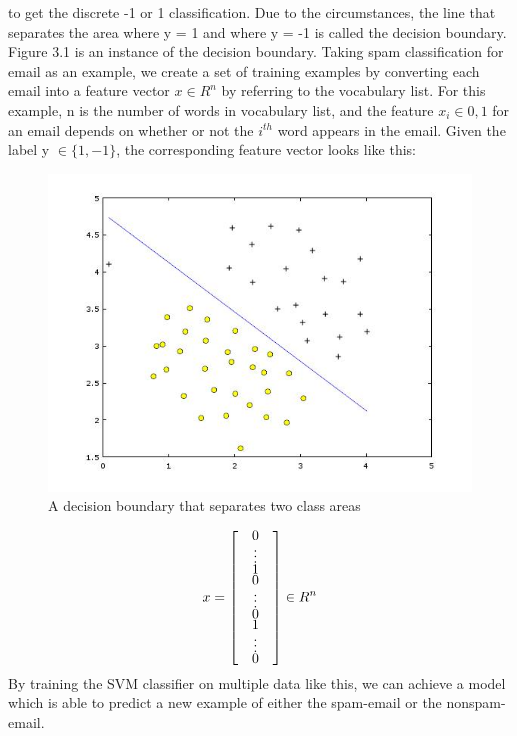 to get the discrete -1 or 1 classification. Due to the circumstances, the line that separates the area where y = 1 and where y = -1 is called the decision boundary. Figure 3.1 is an instance of the decision boundary. Taking spam classification for email as an example, we create a set of training examples by converting each email into a feature vector $x \in R^n$ by referring to the vocabulary list. For this example, n is the number of words in vocabulary list, and the feature $x_i\in {0,1}$ for an email depends on whether or not the $i^{th}$ word appears in the email. Given the label y $\in \{1, -1\}$, the corresponding feature vector looks like this: 
\begin{figure}[!b]
    \includegraphics[width = \linewidth]{Fig1}
    \caption{A decision boundary that separates two class areas}
    \label{fig3.1}
\end{figure}
\begin{align*}
x = 
\renewcommand{\arraystretch}{0.4}
\begin{bmatrix}
        & 0 &\\
        & \vdots &\\
        & 1 &\\
        & 0 &\\
        & \vdots &\\
        & 0 &\\
        & 1 &\\
        & \vdots &\\
        & 0 &
    \end{bmatrix}
    \in R^n
\end{align*}
By training the SVM classifier on multiple data like this, we can achieve a model which is able to predict a new example of either the spam-email or the nonspam-email.\par   
